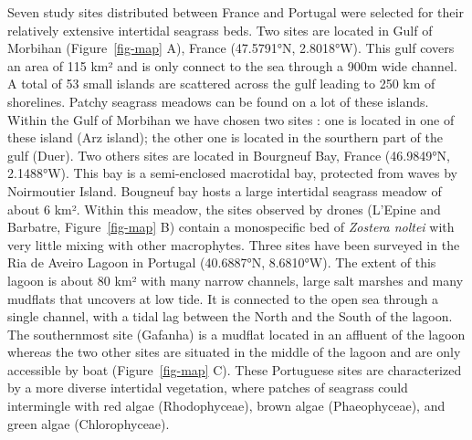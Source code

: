 \documentclass[
  number]{elsarticle}
\begin{document}
Seven study sites distributed between France and Portugal were selected
for their relatively extensive intertidal seagrass beds. Two sites are
located in Gulf of Morbihan (Figure~\ref{fig-map} A), France (47.5791°N,
2.8018°W). This gulf covers an area of 115 km² and is only connect to
the sea through a 900m wide channel. A total of 53 small islands are
scattered across the gulf leading to 250 km of shorelines. Patchy
seagrass meadows can be found on a lot of these islands. Within the Gulf
of Morbihan we have chosen two sites : one is located in one of these
island (Arz island); the other one is located in the sourthern part of
the gulf (Duer). Two others sites are located in Bourgneuf Bay, France
(46.9849°N, 2.1488°W). This bay is a semi-enclosed macrotidal bay,
protected from waves by Noirmoutier Island. Bougneuf bay hosts a large
intertidal seagrass meadow of about 6 km². Within this meadow, the sites
observed by drones (L'Epine and Barbatre, Figure~\ref{fig-map} B)
contain a monospecific bed of \emph{Zostera noltei} with very little
mixing with other macrophytes. Three sites have been surveyed in the Ria
de Aveiro Lagoon in Portugal (40.6887°N, 8.6810°W). The extent of this
lagoon is about 80 km² with many narrow channels, large salt marshes and
many mudflats that uncovers at low tide. It is connected to the open sea
through a single channel, with a tidal lag between the North and the
South of the lagoon. The southernmost site (Gafanha) is a mudflat
located in an affluent of the lagoon whereas the two other sites are
situated in the middle of the lagoon and are only accessible by boat
(Figure~\ref{fig-map} C). These Portuguese sites are characterized by a
more diverse intertidal vegetation, where patches of seagrass could
intermingle with red algae (Rhodophyceae), brown algae (Phaeophyceae),
and green algae (Chlorophyceae).
\end{document}
